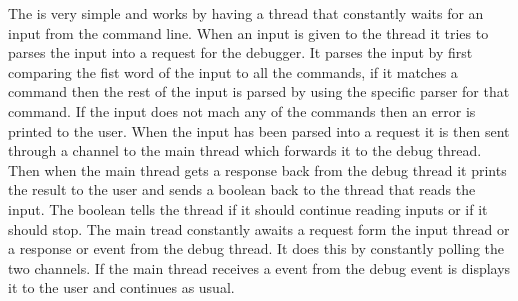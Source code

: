 The  is very simple and works by having a thread that constantly waits for an input from the command line.
When an input is given to the thread it tries to parses the input into a request for the debugger.
It parses the input by first comparing the fist word of the input to all the commands, if it matches a command then the rest of the input is parsed by using the specific parser for that command.
If the input does not mach any of the commands then an error is printed to the user.
When the input has been parsed into a request it is then sent through a channel to the main thread which forwards it to the debug thread.
Then when the main thread gets a response back from the debug thread it prints the result to the user and sends a boolean back to the thread that reads the input.
The boolean tells the thread if it should continue reading inputs or if it should stop.
The main tread constantly awaits a request form the input thread or a response or event from the debug thread.
It does this by constantly polling the two channels.
If the main thread receives a event from the debug event is displays it to the user and continues as usual.

